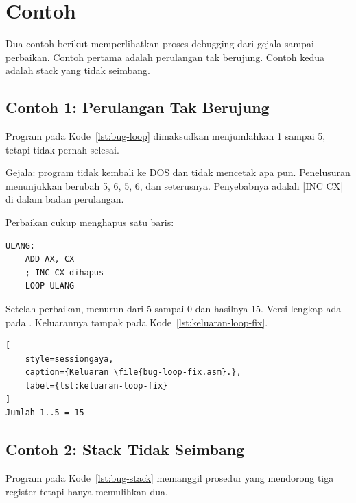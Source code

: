 \section{Contoh}
\label{sec:contoh-bab16}

Dua contoh berikut memperlihatkan proses debugging dari gejala sampai
perbaikan. Contoh pertama adalah perulangan tak berujung. Contoh
kedua adalah stack yang tidak seimbang.

\subsection{Contoh 1: Perulangan Tak Berujung}

Program pada Kode~\ref{lst:bug-loop} dimaksudkan menjumlahkan 1 sampai
5, tetapi tidak pernah selesai.



Gejala: program tidak kembali ke DOS dan tidak mencetak apa pun.
Penelusuran menunjukkan  berubah 5, 6, 5, 6, dan seterusnya.
Penyebabnya adalah \lstasm|INC CX| di dalam badan perulangan.

Perbaikan cukup menghapus satu baris:

\begin{lstlisting}[language=MASM, numbers=none]
ULANG:
    ADD AX, CX
    ; INC CX dihapus
    LOOP ULANG
\end{lstlisting}

Setelah perbaikan,  menurun dari 5 sampai 0 dan hasilnya 15.
Versi lengkap ada pada . Keluarannya tampak
pada Kode~\ref{lst:keluaran-loop-fix}.

\begin{lstlisting}[
    style=sessiongaya,
    caption={Keluaran \file{bug-loop-fix.asm}.},
    label={lst:keluaran-loop-fix}
]
Jumlah 1..5 = 15
\end{lstlisting}

\subsection{Contoh 2: Stack Tidak Seimbang}

Program pada Kode~\ref{lst:bug-stack} memanggil prosedur yang mendorong
tiga register tetapi hanya memulihkan dua.



